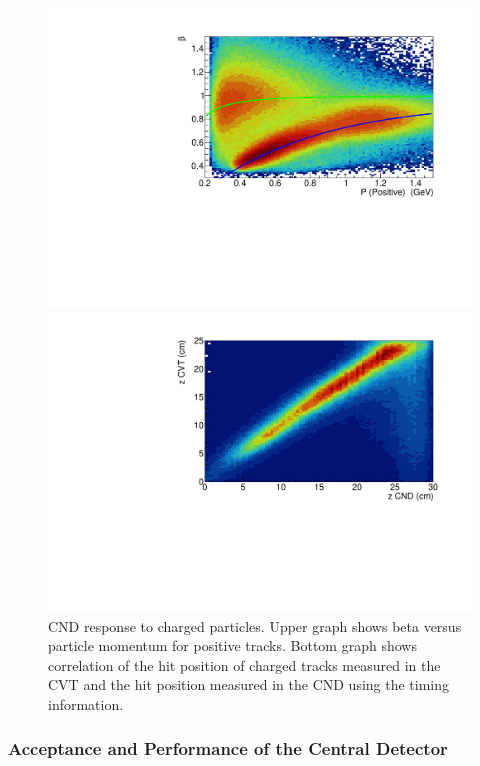 \documentclass[final,3p,twocolumn]{elsarticle}
\begin{document}
\begin{figure}[th!]
\centerline{\includegraphics[width=1.0\columnwidth]{CND-betaP.pdf}}
\centerline{\includegraphics[width=1.0\columnwidth]{CND-z.pdf}}
\caption{CND response to charged particles. Upper graph shows beta versus particle momentum for positive tracks. 
Bottom graph shows correlation of the hit position of charged tracks measured in the CVT and the hit position measured 
in the CND using the timing information.}
\label{cnd-performance}
\end{figure}

\subsubsection{Acceptance and Performance of the Central Detector} 
\end{document}
